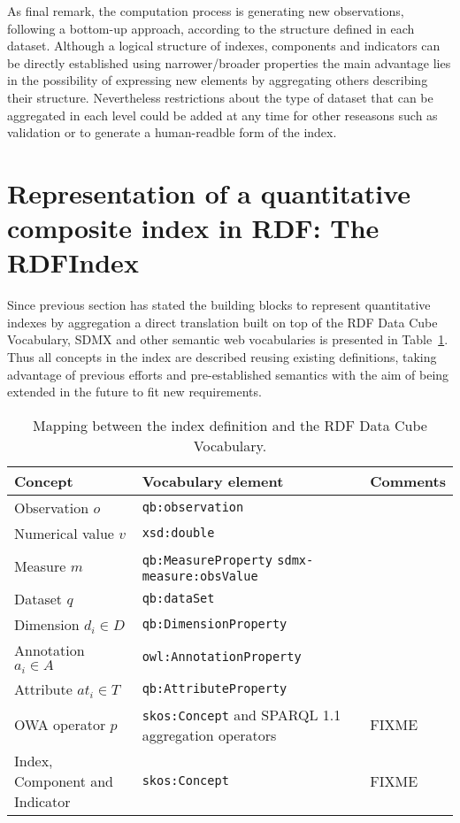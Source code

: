 \documentclass{llncs}
\begin{document}
As final remark, the computation process is generating new observations, following a bottom-up approach, according to the structure defined 
in each dataset. Although a logical structure of indexes, components and indicators can be directly established using narrower/broader properties 
the main advantage lies in the possibility of expressing new elements by aggregating others describing their structure. Nevertheless restrictions 
about the type of dataset that can be aggregated in each level could be added at any time for other reseasons such as validation or to generate 
a human-readble form of the index.


\section{Representation of a quantitative composite index in RDF: The RDFIndex}
Since previous section has stated the building blocks to represent quantitative indexes by aggregation a direct translation built 
on top of the RDF Data Cube Vocabulary, SDMX and other semantic web vocabularies is presented in Table~\ref{index-to-rdf}. Thus 
all concepts in the index are described reusing existing definitions, taking advantage of previous efforts and pre-established semantics 
with the aim of being extended in the future to fit new requirements.

\begin{table}[!htb]
\renewcommand{\arraystretch}{1.3}
\begin{center}
\begin{tabular}{|p{3cm}||p{6cm}|p{3cm}|}
\hline
  \textbf{Concept} & \textbf{Vocabulary element} &  \textbf{Comments}  \\  \hline
   Observation $o$ & \texttt{qb:observation} &  \\ \hline
   Numerical value $v$ & \texttt{xsd:double} &  \\ \hline
   Measure $m$ & \texttt{qb:MeasureProperty} \texttt{sdmx-measure:obsValue} &  \\ \hline
   Dataset $q$ & \texttt{qb:dataSet} &  \\ \hline
   Dimension $d_i \in D$ & \texttt{qb:DimensionProperty} &  \\ \hline
   Annotation $a_i \in A$ & \texttt{owl:AnnotationProperty} &  \\ \hline
   Attribute $at_i \in T$ & \texttt{qb:AttributeProperty} &  \\ \hline
   OWA operator $p$ &  \texttt{skos:Concept} and SPARQL 1.1 aggregation operators & FIXME \\ \hline
   Index, Component and Indicator & \texttt{skos:Concept} & FIXME \\ \hline
  \hline
  \end{tabular}
  \caption{Mapping between the index definition and the RDF Data Cube Vocabulary.}
  \label{index-to-rdf}
  \end{center}
\end{table} 
\end{document}
